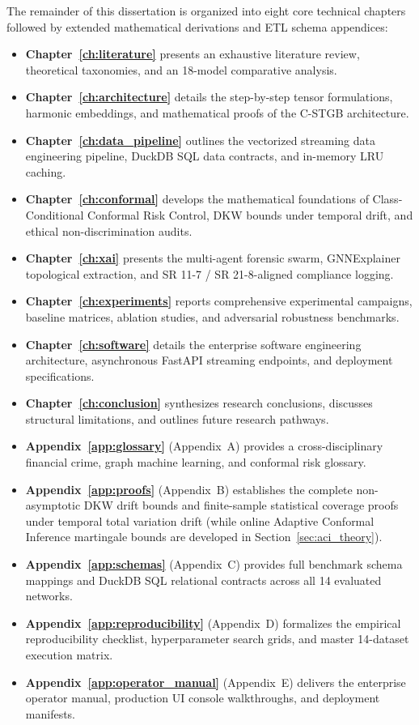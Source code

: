 The remainder of this dissertation is organized into eight core technical chapters followed by extended mathematical derivations and ETL schema appendices:
\begin{itemize}
    \item \textbf{Chapter~\ref{ch:literature}} presents an exhaustive literature review, theoretical taxonomies, and an 18-model comparative analysis.
    \item \textbf{Chapter~\ref{ch:architecture}} details the step-by-step tensor formulations, harmonic embeddings, and mathematical proofs of the C-STGB architecture.
    \item \textbf{Chapter~\ref{ch:data_pipeline}} outlines the vectorized streaming data engineering pipeline, DuckDB SQL data contracts, and in-memory LRU caching.
    \item \textbf{Chapter~\ref{ch:conformal}} develops the mathematical foundations of Class-Conditional Conformal Risk Control, DKW bounds under temporal drift, and ethical non-discrimination audits.
    \item \textbf{Chapter~\ref{ch:xai}} presents the multi-agent forensic swarm, GNNExplainer topological extraction, and SR 11-7 / SR 21-8-aligned compliance logging.
    \item \textbf{Chapter~\ref{ch:experiments}} reports comprehensive experimental campaigns, baseline matrices, ablation studies, and adversarial robustness benchmarks.
    \item \textbf{Chapter~\ref{ch:software}} details the enterprise software engineering architecture, asynchronous FastAPI streaming endpoints, and deployment specifications.
    \item \textbf{Chapter~\ref{ch:conclusion}} synthesizes research conclusions, discusses structural limitations, and outlines future research pathways.
    \item \textbf{Appendix~\ref{app:glossary}} (Appendix~A) provides a cross-disciplinary financial crime, graph machine learning, and conformal risk glossary.
    \item \textbf{Appendix~\ref{app:proofs}} (Appendix~B) establishes the complete non-asymptotic DKW drift bounds and finite-sample statistical coverage proofs under temporal total variation drift (while online Adaptive Conformal Inference martingale bounds are developed in Section~\ref{sec:aci_theory}).
    \item \textbf{Appendix~\ref{app:schemas}} (Appendix~C) provides full benchmark schema mappings and DuckDB SQL relational contracts across all 14 evaluated networks.
    \item \textbf{Appendix~\ref{app:reproducibility}} (Appendix~D) formalizes the empirical reproducibility checklist, hyperparameter search grids, and master 14-dataset execution matrix.
    \item \textbf{Appendix~\ref{app:operator_manual}} (Appendix~E) delivers the enterprise operator manual, production UI console walkthroughs, and deployment manifests.
\end{itemize}
